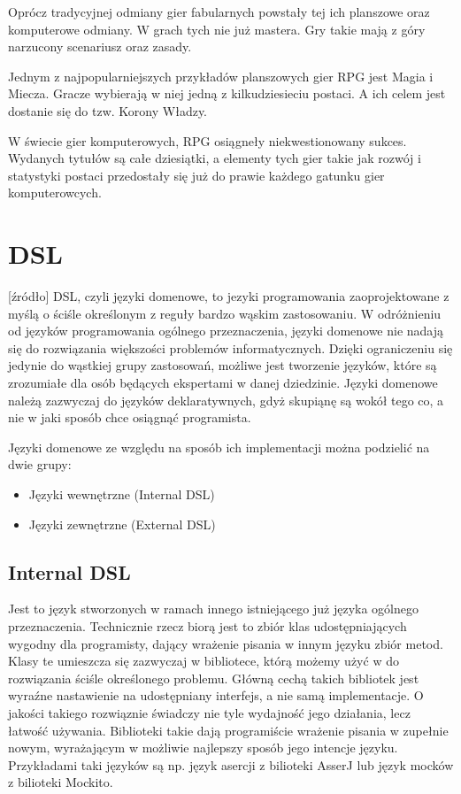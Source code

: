 \documentclass	{xmgr}
\begin{document}
Oprócz tradycyjnej odmiany gier fabularnych powstały tej ich planszowe oraz komputerowe odmiany. W grach tych nie już mastera. Gry takie mają z góry narzucony scenariusz oraz zasady. 

Jednym z najpopularniejszych przykładów planszowych gier RPG jest Magia i Miecza. Gracze wybierają w niej jedną z kilkudziesieciu postaci. A ich celem jest dostanie się do tzw. Korony Władzy. 

W świecie gier komputerowych, RPG osiągneły niekwestionowany sukces. Wydanych tytułów są całe dziesiątki, a elementy tych gier takie jak rozwój i statystyki postaci przedostały się już do prawie każdego gatunku gier komputerowcych.

\section{DSL}

[źródło]
DSL, czyli języki domenowe, to jezyki programowania zaoprojektowane z myślą o ściśle określonym z reguły bardzo wąskim zastosowaniu. W odróżnieniu od języków programowania ogólnego przeznaczenia, języki domenowe nie nadają się do rozwiązania większości problemów informatycznych. Dzięki ograniczeniu się jedynie do wąstkiej grupy zastosowań, możliwe jest tworzenie języków, które są zrozumiałe dla osób będących ekspertami w danej dziedzinie. Języki domenowe należą zazwyczaj do języków deklaratywnych, gdyż skupiąnę są wokół tego co, a nie w jaki sposób chce osiągnąć programista.

Języki domenowe ze względu na sposób ich implementacji można podzielić na dwie grupy:
\begin{itemize}
\item Języki wewnętrzne (Internal DSL)
\item Języki zewnętrzne (External DSL)
\end{itemize}

\subsection{Internal DSL}

Jest to język stworzonych w ramach innego istniejącego już języka ogólnego przeznaczenia. Technicznie rzecz biorą jest to zbiór klas udostępniających wygodny dla programisty, dający wrażenie pisania w innym języku zbiór metod. Klasy te umieszcza się zazwyczaj w bibliotece, którą możemy użyć w do rozwiązania ściśle określonego problemu. Główną cechą takich bibliotek jest wyraźne nastawienie na udostępniany interfejs, a nie samą implementacje. O jakości takiego rozwiąznie świadczy nie tyle wydajność jego działania, lecz łatwość używania. Biblioteki takie dają programiście wrażenie pisania w zupełnie nowym, wyrażającym w możliwie najlepszy sposób jego intencje języku.
Przykładami taki języków są np. język asercji z bilioteki AsserJ lub język mocków z bilioteki Mockito. 
\end{document}

